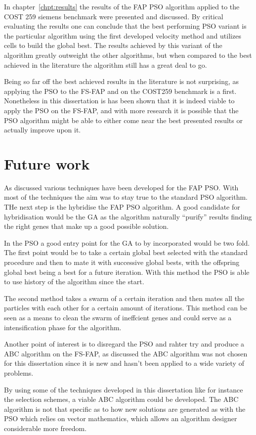 In chapter~\ref{chpt:results} the results of the FAP PSO algorithm applied to the COST 259 siemens benchmark were presented and discussed. By critical evaluating the results one can conclude that the best performing PSO variant is the particular algorithm using the first developed velocity method and utilizes cells to build the global best. The results achieved by this variant of the algorithm greatly outweight the other algorithms, but when compared to the best achieved in the literature the algorithm still has a great deal to go.

Being so far off the best achieved results in the literature is not surprising, as applying the PSO to the FS-FAP and on the COST259 benchmark is a first. Nonetheless in this dissertation is has been shown that it is indeed viable to apply the PSO on the FS-FAP, and with more research it is possible that the PSO algorithm might be able to either come near the best presented results or actually improve upon it.

\section{Future work}
As discussed various techniques have been developed for the FAP PSO. With most of the techniques the aim was to stay true to the standard PSO algorithm. THe next step is the hybridise the FAP PSO algorithm. A good candidate for hybridisation would be the GA as the algorithm naturally ``purify'' results finding the right genes that make up a good possible solution.

In the PSO a good entry point for the GA to by incorporated would be two fold. The first point would be to take a certain global best selected with the standard procedure and then to mate it with successive global bests, with the offspring global best being a best for a future iteration. With this method the PSO is able to use history of the algorithm since the start.

The second method takes a swarm of a certain iteration and then mates all the particles with each other for a certain amount of iterations. This method can be seen as a means to clean the swarm of ineffcient genes and could serve as a intensification phase for the algorithm.

Another point of interest is to disregard the PSO and rahter try and produce a ABC algorithm on the FS-FAP, as discussed the ABC algorithm was not chosen for this dissertation since it is new and hasn't been applied to a wide variety of problems. 

By using some of the techniques developed in this dissertation like for instance the selection schemes, a viable ABC algorithm could be developed. The ABC algorithm is not that specific as to how new solutions are generated as with the PSO which relies on vector mathematics, which allows an algorithm designer considerable more freedom.





